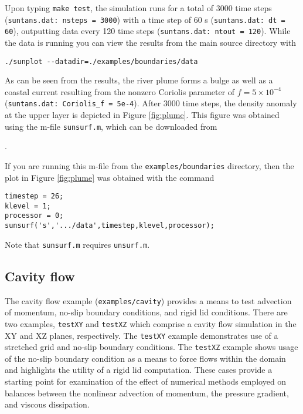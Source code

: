 Upon typing \verb+make test+, the simulation runs for a total of 3000 time steps (\verb+suntans.dat: nsteps = 3000+)
with a time step of 60 s (\verb+suntans.dat: dt = 60+), outputting
data every 120 time steps (\verb+suntans.dat: ntout = 120+).  While the data is running you can view the
results from the main source directory with
\begin{verbatim}
./sunplot --datadir=./examples/boundaries/data
\end{verbatim}
As can be seen from the results, the river plume forms a bulge as well as a coastal current resulting from
the nonzero Coriolis parameter of $f=5\times 10^{-4}$ (\verb+suntans.dat: Coriolis_f = 5e-4+).
After 3000 time steps, the density anomaly at the upper layer is depicted in Figure \ref{fig:plume}.  This
figure was obtained using the m-file \verb+sunsurf.m+, which can be downloaded from

\medskip
\noindent
\mfiledownload.

\medskip
\noindent
If you are running this m-file from the \verb+examples/boundaries+ directory, then the plot in Figure \ref{fig:plume}
was obtained with the command
\begin{verbatim}
timestep = 26;
klevel = 1;
processor = 0;
sunsurf('s','.../data',timestep,klevel,processor);
\end{verbatim}
Note that \verb+sunsurf.m+ requires \verb+unsurf.m+. 

\subsection{Cavity flow} \label{sec:cavityflow}

The cavity flow example (\verb+examples/cavity+) provides a means to 
test advection of momentum, no-slip boundary conditions, and  rigid lid 
conditions.  There are two examples, \verb+testXY+ and \verb+testXZ+ which
comprise a cavity flow simulation in the XY and XZ planes, respectively. 
The \verb+testXY+ example demonstrates use of a stretched grid and no-slip 
boundary conditions.  The \verb+testXZ+ example shows usage of the no-slip 
boundary condition as a means to force flows within the domain and highlights 
the utility of a rigid lid computation.  These cases provide a starting point 
for examination of the effect of numerical methods employed on balances 
between the nonlinear advection of momentum, the pressure gradient, 
and viscous dissipation.

